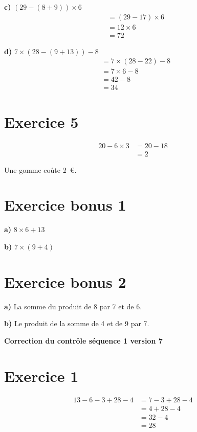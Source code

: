 \documentclass[12pt]{extarticle}
\begin{document}
\textbf{c)} $(29 - (8 + 9)) \times 6$
\begin{align*}
&= (29 - 17) \times 6 \\
&= 12 \times 6 \\
&= 72
\end{align*}

\textbf{d)} $7 \times (28 - (9 + 13)) - 8$
\begin{align*}
&= 7 \times (28 - 22) - 8 \\
&= 7 \times 6 - 8 \\
&= 42 - 8 \\
&= 34
\end{align*}

\section*{Exercice 5}
\begin{align*}
20 - 6 \times 3 &= 20 - 18 \\
                &= 2
\end{align*}

Une gomme coûte 2~€.

\section*{Exercice bonus 1}

\textbf{a)} $8 \times 6 + 13$

\textbf{b)} $7 \times (9 + 4)$

\section*{Exercice bonus 2}

\textbf{a)} La somme du produit de 8 par 7 et de 6.

\textbf{b)} Le produit de la somme de 4 et de 9 par 7.

\newpage

\begin{center}
\Large\textbf{Correction du contrôle séquence 1 version 7}
\end{center}

\section*{Exercice 1}
\begin{align*}
13 - 6 - 3 + 28 - 4 &= 7 - 3 + 28 - 4 \\
                     &= 4 + 28 - 4 \\
                     &= 32 - 4 \\
                     &= 28
\end{align*}
\end{document}
